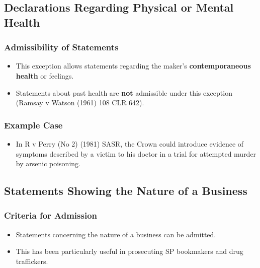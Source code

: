 \subsection{ Declarations Regarding Physical or Mental
Health}\label{declarations-regarding-physical-or-mental-health}

\subsubsection{Admissibility of
Statements}\label{admissibility-of-statements}

\begin{itemize}
\tightlist
\item
  This exception allows statements regarding the maker's
  \textbf{contemporaneous health} or feelings.
\item
  Statements about past health are \textbf{not} admissible under this
  exception (Ramsay v Watson (1961) 108 CLR 642).
\end{itemize}

\subsubsection{Example Case}\label{example-case-2}

\begin{itemize}
\tightlist
\item
  In R v Perry (No 2) (1981) SASR, the Crown could introduce evidence of
  symptoms described by a victim to his doctor in a trial for attempted
  murder by arsenic poisoning.
\end{itemize}

\subsection{ Statements Showing the Nature of a
Business}\label{statements-showing-the-nature-of-a-business}

\subsubsection{Criteria for Admission}\label{criteria-for-admission}

\begin{itemize}
\tightlist
\item
  Statements concerning the nature of a business can be admitted.
\item
  This has been particularly useful in prosecuting SP bookmakers and
  drug traffickers.
\end{itemize}

